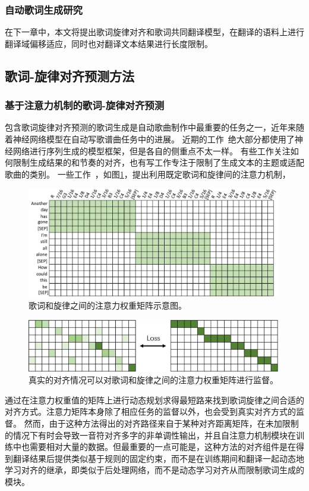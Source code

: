 \subsubsection{自动歌词生成研究}


在下一章中，本文将提出歌词旋律对齐和歌词共同翻译模型，在翻译的语料上进行翻译域偏移适应，同时也对翻译文本结果进行长度限制。
\subsection{歌词-旋律对齐预测方法}
\subsubsection{基于注意力机制的歌词-旋律对齐预测}
包含歌词旋律对齐预测的歌词生成是自动歌曲制作中最重要的任务之一，近年来随着神经网络模型在自动写歌谱曲任务中的进展。
近期的工作~\citep{lee-etal-2019-icomposer,Chen2020MelodyConditionedLG,songmass,telemelody,ai_lyricist,xue-etal-2021-deeprapper}绝大部分都使用了神经网络进行序列生成的模型框架，但是各自的侧重点不太一样。
有些工作关注如何限制生成结果的和节奏的对齐，也有写工作专注于限制了生成文本的主题或适配歌曲的类别。
一些工作~\citep{songmass,telemelody}，如图\ref{fig:attn_diag}，提出利用既定歌词和旋律间的注意力机制，
\begin{figure}[ht]
  \includegraphics[width=0.99\textwidth]{figure/related/digattn.pdf}
  \caption{歌词和旋律之间的注意力权重矩阵示意图。}
  \label{fig:attn_diag}
\end{figure}
\begin{figure}[ht]
  \includegraphics[width=0.99\textwidth]{figure/related/GuidedAttention.png}
  \caption{真实的对齐情况可以对歌词和旋律之间的注意力权重矩阵进行监督。}
  \label{fig:attn_loss}
\end{figure}
通过在注意力权重值的矩阵上进行动态规划求得最短路来找到歌词旋律之间合适的对齐方式。注意力矩阵本身除了相应任务的监督以外，也会受到真实对齐方式的监督。
然而，由于这种方法得出的对齐路径来自于某种对齐距离矩阵，在未加限制的情况下有时会导致一音符对齐多字的非单调性输出，并且自注意力机制模块在训练中也需要相对大量的数据。但最重要的一点可能是，这种方法的对齐组件是在得到翻译结果后提供类似基于规则的固定约束，而不是在训练期间和翻译一起动态地学习对齐的继承，即类似于后处理网络，而不是动态学习对齐从而限制歌词生成的模块。


